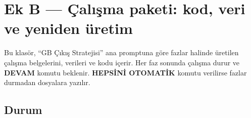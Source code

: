 \hypertarget{README}{%
\chapter{Ek B --- Çalışma paketi: kod, veri ve yeniden üretim}\label{README}}

Bu klasör, ``GB Çıkış Stratejisi'' ana promptuna göre fazlar halinde üretilen çalışma belgelerini, verileri ve kodu içerir. Her faz sonunda çalışma durur ve \textbf{DEVAM} komutu beklenir. \textbf{HEPSİNİ OTOMATİK} komutu verilirse fazlar durmadan dosyalara yazılır.

\hypertarget{README-durum}{%
\section{Durum}\label{README-durum}}

\begingroup\gbtablo\small

